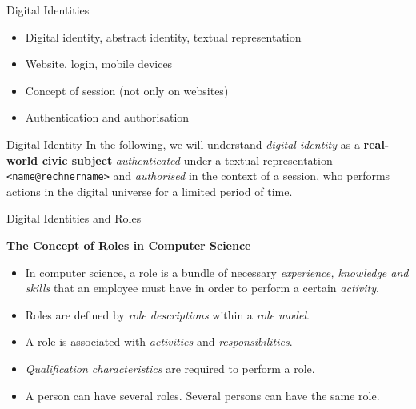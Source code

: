 \documentclass{beamer}
\newcommand{\ueberschrift}[1]{\begin{center}\bf #1\end{center}}
\begin{document}
\begin{frame}{Digital Identities}
\begin{itemize}
\item Digital identity, abstract identity, textual representation
\item Website, login, mobile devices
\item Concept of session (not only on websites)
\item Authentication and authorisation
\end{itemize}
\begin{block}{Digital Identity}
  In the following, we will understand \emph{digital identity} as a
  \textbf{real-world civic subject} \emph{authenticated} under a textual
  representation \texttt{<name@rechnername>} and \emph{authorised} in the
  context of a session, who performs actions in the digital universe for a
  limited period of time.
\end{block}
\end{frame}
\begin{frame}{Digital Identities and Roles}
  \ueberschrift{The Concept of Roles in Computer Science}
  
\begin{itemize}
\item In computer science, a role is a bundle of necessary \emph{experience,
  knowledge and skills} that an employee must have in order to perform a
  certain \emph{activity}.
\item Roles are defined by \emph{role descriptions} within a \emph{role
  model}.
\item A role is associated with \emph{activities} and \emph{responsibilities}.
\item \emph{Qualification characteristics} are required to perform a role.
\item A person can have several roles. Several persons can have the same role.
\end{itemize}
\end{frame}
\end{document}
